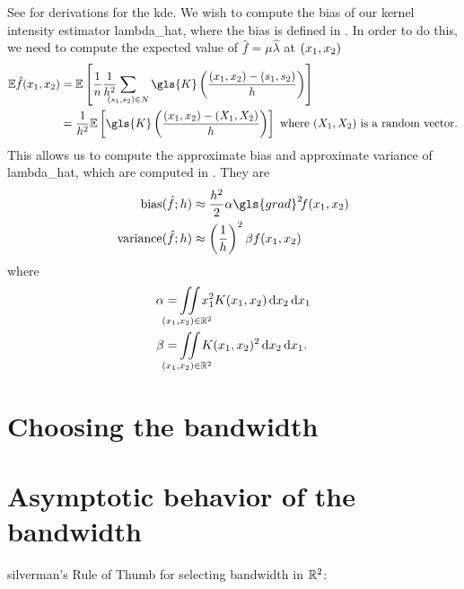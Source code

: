 See  for derivations for the \gls{kde}.
We wish to compute the bias of our \gls{kernel intensity estimator} \gls{lambda_hat},
where the bias is defined in .
In order to do this, we need to compute the expected value of $\hat{f} = \mu \hat{\lambda}$ at $(x_1, x_2)$
\begin{align}
    \E \hat{f}\xvec
        &= \E \left[ \frac{1}{n}\sumS{\gls{K}\left(\frac{\xvec-(s_1, s_2)}{h}\right)} \right] \nonumber \\
        &= \frac{1}{h^2} \E 
                \left[ 
                    \gls{K}\left(\frac{\xvec-(X_1, X_2)}{h}\right) 
                \right] 
            ~\text{where}~(X_1,X_2)~\text{is a random vector.} \nonumber
\end{align}
This allows us to compute the approximate bias and approximate variance of \gls{lambda_hat},
which are computed in .
They are
\begin{align}
    \mbox{bias}(\hat{f}; h) & \approx \frac{h^2}{2} \alpha \gls{grad}^2 \! f \xvec \\
    \mbox{variance}(\hat{f}; h) & \approx \left(\frac{1}{h}\right)^{2} \beta f \xvec
\end{align}
where
\begin{align}
    \alpha & = \iintR{x_1^2 K(x_1,x_2)} \\
    \beta & = \iintR{K(x_1,x_2)^2} \text{.}
\end{align}


\section{Choosing the bandwidth}
\label{sec:theory:bandwidth}

\section{Asymptotic behavior of the bandwidth}
\label{sec:theory:asymptotic_bandwidth}

\Gls{silverman}'s Rule of Thumb for selecting bandwidth in $\mathbb{R}^2$:

